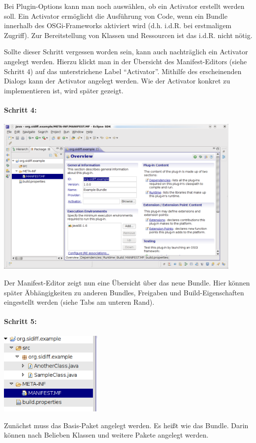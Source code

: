 \documentclass[10pt,a4paper]{scrartcl}
\begin{document}
Bei Plugin-Options kann man noch auswählen, ob ein Activator erstellt werden soll.
Ein Activator ermöglicht die Ausführung von Code, wenn ein Bundle innerhalb des
OSGi-Frameworks aktiviert wird (d.h. i.d.R. bei erstmaligem Zugriff). Zur 
Bereitstellung von Klassen und Ressourcen ist das i.d.R. nicht nötig.

Sollte dieser Schritt vergessen worden sein, kann auch nachträglich ein Activator 
angelegt werden. 
Hierzu klickt man in der Übersicht des Manifest-Editors (siehe Schritt 4) auf
das unterstrichene Label ``Activator''. Mithilfe des erscheinenden Dialogs kann
der Activator angelegt werden. Wie der Activator konkret zu implementieren ist,
wird später gezeigt.

\paragraph{Schritt 4:}
\begin{center}
\includegraphics[width=12cm]{pics/newbundle4.png}
\end{center}
Der Manifest-Editor zeigt nun eine Übersicht über das neue Bundle. Hier können
später Äbhängigkeiten zu anderen Bundles, Freigaben und Build-Eigenschaften
eingestellt werden (siehe Tabs am unteren Rand).

\paragraph{Schritt 5:}
\begin{center}
\includegraphics[width=5cm]{pics/newbundle5.png}
\end{center}
Zunächst muss das Basis-Paket angelegt werden. Es heißt wie das Bundle. Darin
können nach Belieben Klassen und weitere Pakete angelegt werden.
\end{document}
